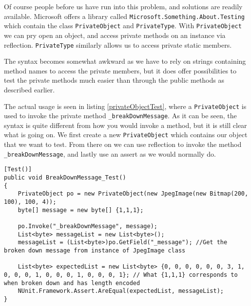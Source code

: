 Of course people before us have run into this problem, and solutions are readily available.
Microsoft offers a library called \lstinline|Microsoft.Something.About.Testing| which contain the class \lstinline|PrivateObject| and \lstinline|PrivateType|.
With \lstinline|PrivateObject| we can pry open an object, and access private methods on an instance via reflection. \lstinline|PrivateType| similarly allows us to access private static members. 

The syntax becomes somewhat awkward as we have to rely on strings containing method names to access the private members, but it does offer possibilities to test the private methods much easier than through the public methods as described earlier.

The actual usage is seen in listing \ref{privateObjectTest}, where a \lstinline|PrivateObject| is used to invoke the private method \lstinline|_breakDownMessage|. As it can be seen, the syntax is quite different from how you would invoke a method, but it is still clear what is going on. We first create a new \lstinline|PrivateObject| which contains our object that we want to test.  From there on we can use reflection to invoke the method \lstinline|_breakDownMessage|, and lastly use an assert as we would normally do.

\begin{lstlisting}[firstnumber=23,label=privateObjectTest,caption={Example usage of the \lstinline|PrivateObject| class \textbf{File: }JPEGImageTests.cs}]
[Test()]
public void BreakDownMessage_Test()
{
    PrivateObject po = new PrivateObject(new JpegImage(new Bitmap(200, 100), 100, 4));
    byte[] message = new byte[] {1,1,1};

    po.Invoke("_breakDownMessage", message);
    List<byte> messageList = new List<byte>();
    messageList = (List<byte>)po.GetField("_message"); //Get the broken down message from instance of JpegImage class

    List<byte> expectedList = new List<byte> {0, 0, 0, 0, 0, 0, 3, 1, 0, 0, 0, 1, 0, 0, 0, 1, 0, 0, 0, 1}; // What {1,1,1} corresponds to when broken down and has length encoded
    NUnit.Framework.Assert.AreEqual(expectedList, messageList);
}
\end{lstlisting}